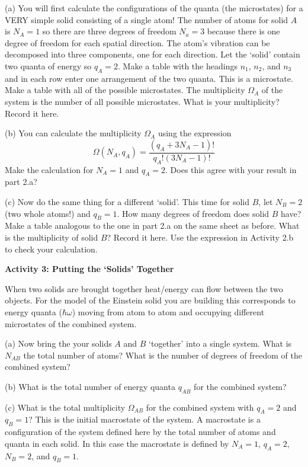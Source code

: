 (a) You will first calculate the configurations of 
the quanta (the microstates) for a VERY simple solid consisting of a single
atom!
The number of atoms for solid $A$ is $N_A=1$ so there are three degrees of
freedom $N_a=3$ because there is one degree of freedom for each
spatial direction.
The atom's vibration can be decomposed into three components, one for each direction.
Let the `solid' contain two quanta of energy so $q_A=2$.
Make a table with the headings $n_1$, $n_2$, and $n_3$ 
and in each row enter one
arrangement of the two quanta.
This is a microstate.
Make a table with all of the possible microstates.
The multiplicity $\Omega_A$ of the system is the number of all possible
microstates. What is your multiplicity?
Record it here.
\vspace{45mm}

(b) You can calculate the multiplicity $\Omega_A$ using the expression
\begin{equation}
\Omega(N_A,q_A) = \frac{(q_A + 3N_A -1)!}{q_A! (3N_A-1)!}
\end{equation}
Make the calculation for $N_A = 1$ and $q_A = 2$.
Does this agree with your result in part 2.a?
\vspace{15mm}

(c) Now do the same thing for a different `solid'.
This time for solid $B$, let $N_B = 2$ (two whole atoms!) and $q_B = 1$.
How many degrees of freedom does solid $B$ have?
Make a table analogous to the one in part 2.a on the same sheet as before.
What is the multiplicity of solid $B$?
Record it here.
Use the expression in Activity 2.b to check your calculation.
\vspace{45mm}

\textbf{Activity 3: Putting the `Solids' Together}

When two solids are brought together heat/energy can flow between the two objects.
For the model of the Einstein solid you are building this corresponds to 
energy quanta ($\hbar \omega$) moving from atom to atom and occupying different
microstates of the combined system.

(a) Now bring the your solids $A$ and $B$ `together' into a single system.
What is $N_{AB}$ the total number of atoms?
What is the number of degrees of freedom of the combined system?
\vspace{10mm}

(b) What is the total number of energy quanta $q_{AB}$ for the combined system?
\vspace{10mm}

(c) What is the total multiplicity $\Omega_{AB}$ for the combined system
with $q_A=2$ and $q_B=1$?
This is the initial macrostate of the system.
A macrostate is a configuration of the system defined here by the total number
of atoms and quanta in each solid.
In this case the macrostate is defined by $N_A=1$, $q_A=2$, $N_B=2$, and $q_B= 1$.
\vspace{15mm}

